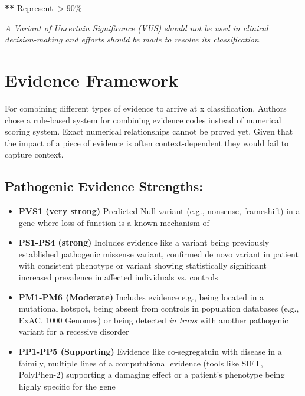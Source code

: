 \documentclass[../main.tex]{subfiles}
\begin{document}
\textbf{**} Represent $> 90\%$ 

\vspace{0.2cm}

\textit{A Variant of Uncertain Significance (VUS) should not be used in clinical decision-making and efforts should be made to resolve its classification}

\section{Evidence Framework} 
For combining different types of evidence to arrive at x classification. Authors chose a rule-based system for combining evidence codes instead of numerical scoring system. Exact numerical relationships cannot be proved yet. Given that the impact of a piece of evidence is often context-dependent they would fail to capture context.

\subsection{Pathogenic Evidence Strengths:}
\begin{itemize}
    \item \textbf{PVS1 (very strong)} Predicted Null variant (e.g., nonsense, frameshift) in a gene where loss of function is a known mechanism of 
    \item \textbf{PS1-PS4 (strong)} Includes evidence like a variant being previously established pathogenic missense variant, confirmed de novo variant in patient with consistent phenotype or variant showing statistically significant increased prevalence in affected individuals vs. controls
    \item \textbf{PM1-PM6 (Moderate)} Includes evidence e.g., being located in a mutational hotspot, being absent from controls in population databases (e.g., ExAC, 1000 Genomes) or being detected \textit{in trans} with another pathogenic variant for a recessive disorder 
    \item \textbf{PP1-PP5 (Supporting)} Evidence like co-segregatuin with disease in a faimily, multiple lines of a computational evidence (tools like SIFT, PolyPhen-2) supporting a damaging effect or a patient's phenotype being highly specific for the gene
\end{itemize}
\end{document}
